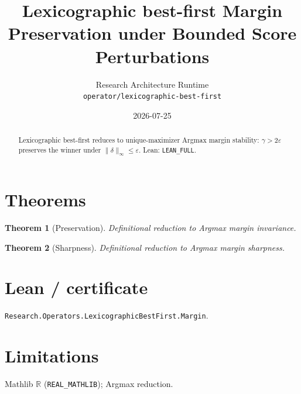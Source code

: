 \documentclass[11pt]{article}
\title{Lexicographic best-first Margin Preservation under Bounded Score Perturbations}
\author{Research Architecture Runtime \\ \texttt{operator/lexicographic-best-first}}
\date{2026-07-25}
\newtheorem{theorem}{Theorem}
\begin{document}
\maketitle
\begin{abstract}
Lexicographic best-first reduces to unique-maximizer Argmax margin stability: $\gamma>2\varepsilon$
preserves the winner under $\|\delta\|_\infty\le\varepsilon$. Lean: \texttt{LEAN\_FULL}.
\end{abstract}
\section{Theorems}
\begin{theorem}[Preservation]
Definitional reduction to Argmax margin invariance.
\end{theorem}
\begin{theorem}[Sharpness]
Definitional reduction to Argmax margin sharpness.
\end{theorem}
\section{Lean / certificate}
\texttt{Research.Operators.LexicographicBestFirst.Margin}.
\section{Limitations}
Mathlib $\mathbb{R}$ (\texttt{REAL\_MATHLIB}); Argmax reduction.
\end{document}
